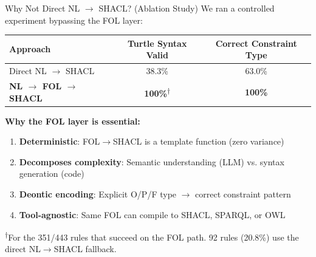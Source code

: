 \documentclass[aspectratio=169, 10pt]{beamer}
\begin{document}
\begin{frame}{Why Not Direct NL $\rightarrow$ SHACL? (Ablation Study)}
    We ran a controlled experiment bypassing the FOL layer:
    
    \vspace{0.2cm}
    \begin{table}[]
        \centering
        \begin{tabular}{lcc}
            \toprule
            \textbf{Approach} & \textbf{Turtle Syntax Valid} & \textbf{Correct Constraint Type} \\
            \midrule
            Direct NL $\rightarrow$ SHACL & 38.3\% & 63.0\% \\
            \textbf{NL $\rightarrow$ FOL $\rightarrow$ SHACL} & \textbf{100\%}\textsuperscript{$\dagger$} & \textbf{100\%} \\
            \bottomrule
        \end{tabular}
    \end{table}
    
    \vspace{0.3cm}
    \textbf{Why the FOL layer is essential:}
    \begin{enumerate}
        \item \textbf{Deterministic}: FOL$\rightarrow$SHACL is a template function (zero variance)
        \item \textbf{Decomposes complexity}: Semantic understanding (LLM) vs. syntax generation (code)
        \item \textbf{Deontic encoding}: Explicit O/P/F type $\rightarrow$ correct constraint pattern
        \item \textbf{Tool-agnostic}: Same FOL can compile to SHACL, SPARQL, or OWL
    \end{enumerate}

    \vspace{0.2cm}
    \footnotesize\textsuperscript{$\dagger$}For the 351/443 rules that succeed on the FOL path. 92 rules (20.8\%) use the direct NL$\rightarrow$SHACL fallback.
\end{frame}
\end{document}
